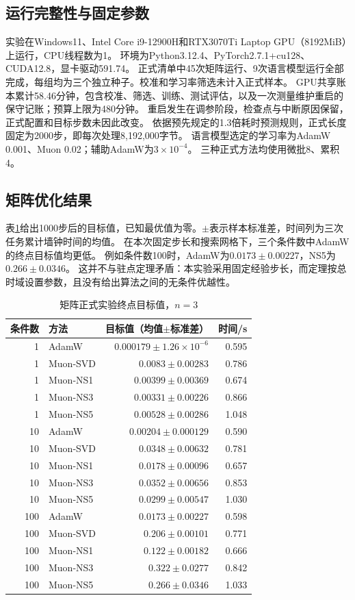 \subsection{运行完整性与固定参数}
实验在Windows11、Intel Core i9-12900H和RTX3070Ti Laptop GPU（8192MiB）上运行，CPU线程数为1。
环境为Python3.12.4、PyTorch2.7.1+cu128、CUDA12.8，显卡驱动591.74。
正式清单中45次矩阵运行、9次语言模型运行全部完成，每组均为三个独立种子。校准和学习率筛选未计入正式样本。
GPU共享账本累计58.46分钟，包含校准、筛选、训练、测试评估，以及一次测量维护重启的保守记账；预算上限为480分钟。
重启发生在调参阶段，检查点与中断原因保留，正式配置和目标步数未因此改变。
依据预先规定的1.3倍耗时预测规则，正式长度固定为2000步，即每次处理8,192,000字节。
语言模型选定的学习率为AdamW 0.001、Muon 0.02；辅助AdamW为$3\times10^{-4}$。
三种正式方法均使用微批8、累积4。

\subsection{矩阵优化结果}
表\ref{tab:matrix}给出1000步后的目标值，已知最优值为零。$\pm$表示样本标准差，时间列为三次任务累计墙钟时间的均值。
在本次固定步长和搜索网格下，三个条件数中AdamW的终点目标值均更低。
例如条件数100时，AdamW为$0.0173\pm 0.00227$，NS5为$0.266\pm 0.0346$。
这并不与驻点定理矛盾：本实验采用固定经验步长，而定理按总时域设置参数，且没有给出算法之间的无条件优越性。
\begin{table}[htbp]\centering\small
\caption{矩阵正式实验终点目标值，$n=3$}\label{tab:matrix}
\begin{tabular}{rlrr}\toprule 条件数&方法&目标值（均值$\pm$标准差）&时间/s\\\midrule
1 & AdamW & $0.000179\pm 1.26\times10^{-6}$ & 0.595 \\
1 & Muon-SVD & $0.0083\pm 0.00283$ & 0.786 \\
1 & Muon-NS1 & $0.00399\pm 0.00369$ & 0.674 \\
1 & Muon-NS3 & $0.00331\pm 0.00226$ & 0.866 \\
1 & Muon-NS5 & $0.00528\pm 0.00286$ & 1.048 \\
10 & AdamW & $0.00204\pm 0.000129$ & 0.590 \\
10 & Muon-SVD & $0.0348\pm 0.00632$ & 0.781 \\
10 & Muon-NS1 & $0.0178\pm 0.00096$ & 0.657 \\
10 & Muon-NS3 & $0.0352\pm 0.00656$ & 0.853 \\
10 & Muon-NS5 & $0.0299\pm 0.00547$ & 1.030 \\
100 & AdamW & $0.0173\pm 0.00227$ & 0.598 \\
100 & Muon-SVD & $0.206\pm 0.00101$ & 0.771 \\
100 & Muon-NS1 & $0.122\pm 0.00182$ & 0.666 \\
100 & Muon-NS3 & $0.322\pm 0.0277$ & 0.842 \\
100 & Muon-NS5 & $0.266\pm 0.0346$ & 1.033 \\
\bottomrule\end{tabular}\end{table}

